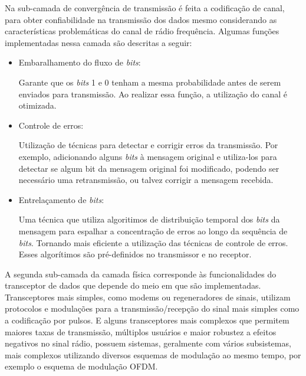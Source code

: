 Na sub-camada de convergência de transmissão é feita a codificação de canal, para obter confiabilidade na transmissão dos dados mesmo considerando as características problemáticas do canal de rádio frequência. Algumas funções implementadas nessa camada são descritas a seguir:
\begin{itemize}
      \item Embaralhamento do fluxo de \emph{bits}:

            Garante que os \emph{bits} 1 e 0 tenham a mesma probabilidade antes de serem enviados para transmissão. Ao realizar essa função, a utilização do canal é otimizada.
      \item Controle de erros:

            Utilização de técnicas para detectar e corrigir erros da transmissão. Por exemplo, adicionando alguns \emph{bits} à mensagem original e utiliza-los para detectar se algum bit da mensagem original foi modificado, podendo ser necessário uma retransmissão, ou talvez corrigir a mensagem recebida.
      \item Entrelaçamento de \emph{bits}:

            Uma técnica que utiliza algoritimos de distribuição temporal dos \emph{bits} da mensagem para espalhar a concentração de erros ao longo da sequência de \emph{bits}. Tornando mais eficiente a utilização das técnicas de controle de erros. Esses algorítimos são pré-definidos no transmissor e no receptor.
\end{itemize}

A segunda sub-camada da camada física corresponde às funcionalidades do transceptor de dados que depende do meio em que são implementadas. Transceptores mais simples, como modems ou regeneradores de sinais, utilizam protocolos e modulações para a transmissão/recepção do sinal mais simples como a codificação por pulsos. E alguns transceptores mais complexos que permitem maiores taxas de transmissão, múltiplos usuários e maior robustez a efeitos negativos no sinal rádio, possuem sistemas, geralmente com vários subsistemas, mais complexos utilizando diversos esquemas de modulação ao mesmo tempo, por exemplo o esquema de modulação OFDM.


